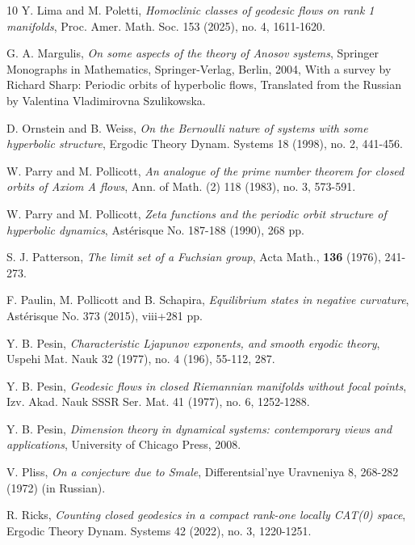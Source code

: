 \documentclass[11pt]{amsart}
\theoremstyle{definition}
\begin{document}
\begin{thebibliography}{10}
Y. Lima and M. Poletti, \emph{Homoclinic classes of geodesic flows on rank 1 manifolds}, Proc. Amer. Math. Soc. 153 (2025), no. 4, 1611-1620.



G. A. Margulis, \emph{On some aspects of the theory of Anosov systems},
Springer Monographs in Mathematics, Springer-Verlag, Berlin, 2004,
With a survey by Richard Sharp: Periodic orbits of hyperbolic flows,
Translated from the Russian by Valentina Vladimirovna Szulikowska.

D. Ornstein and B. Weiss, \emph{On the Bernoulli nature of systems with some hyperbolic
structure}, Ergodic Theory Dynam. Systems 18 (1998), no. 2, 441-456.


W. Parry and M. Pollicott, \emph{An analogue of the prime number theorem for closed orbits of Axiom A flows}, Ann. of Math. (2) 118
(1983), no. 3, 573-591.

W. Parry and M. Pollicott, \emph{Zeta functions and the periodic orbit structure of hyperbolic dynamics}, Ast\'{e}risque No. 187-188 (1990), 268 pp.

 S. J. Patterson, \emph{The limit set of a Fuchsian group},
Acta Math., {\bf 136} (1976), 241-273.

F. Paulin, M. Pollicott and B. Schapira, \emph{Equilibrium states in negative curvature}, Ast\'{e}risque No. 373 (2015), viii+281 pp.



Y. B. Pesin, \emph{Characteristic Ljapunov exponents, and smooth ergodic theory}, Uspehi Mat.
Nauk 32 (1977), no. 4 (196), 55-112, 287.

Y. B. Pesin, \emph{Geodesic flows in closed Riemannian manifolds without focal points}, Izv. Akad. Nauk
SSSR Ser. Mat. 41 (1977), no. 6, 1252-1288.

Y. B. Pesin, \emph{Dimension theory in dynamical systems: contemporary views and applications}, University of Chicago Press, 2008.



V. Pliss, \emph{On a conjecture due to Smale}, Differentsial'nye Uravneniya 8, 268-282 (1972)  (in Russian).

R. Ricks, \emph{Counting closed geodesics in a compact rank-one locally CAT(0) space}, Ergodic Theory Dynam. Systems 42 (2022), no. 3, 1220-1251.



\end{thebibliography}
\end{document}

